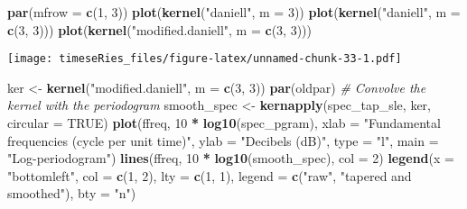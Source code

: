 \documentclass[]{book}
\newenvironment{Shaded}{\begin{snugshade}}{\end{snugshade}}
\newcommand{\CommentTok}[1]{\textcolor[rgb]{0.56,0.35,0.01}{\textit{#1}}}
\newcommand{\DataTypeTok}[1]{\textcolor[rgb]{0.13,0.29,0.53}{#1}}
\newcommand{\DecValTok}[1]{\textcolor[rgb]{0.00,0.00,0.81}{#1}}
\newcommand{\KeywordTok}[1]{\textcolor[rgb]{0.13,0.29,0.53}{\textbf{#1}}}
\newcommand{\NormalTok}[1]{#1}
\newcommand{\OperatorTok}[1]{\textcolor[rgb]{0.81,0.36,0.00}{\textbf{#1}}}
\newcommand{\OtherTok}[1]{\textcolor[rgb]{0.56,0.35,0.01}{#1}}
\newcommand{\StringTok}[1]{\textcolor[rgb]{0.31,0.60,0.02}{#1}}
\begin{document}
\begin{Shaded}
\begin{Highlighting}[]
\KeywordTok{par}\NormalTok{(}\DataTypeTok{mfrow =} \KeywordTok{c}\NormalTok{(}\DecValTok{1}\NormalTok{, }\DecValTok{3}\NormalTok{))}
\KeywordTok{plot}\NormalTok{(}\KeywordTok{kernel}\NormalTok{(}\StringTok{"daniell"}\NormalTok{, }\DataTypeTok{m =} \DecValTok{3}\NormalTok{))}
\KeywordTok{plot}\NormalTok{(}\KeywordTok{kernel}\NormalTok{(}\StringTok{"daniell"}\NormalTok{, }\DataTypeTok{m =} \KeywordTok{c}\NormalTok{(}\DecValTok{3}\NormalTok{, }\DecValTok{3}\NormalTok{)))}
\KeywordTok{plot}\NormalTok{(}\KeywordTok{kernel}\NormalTok{(}\StringTok{"modified.daniell"}\NormalTok{, }\DataTypeTok{m =} \KeywordTok{c}\NormalTok{(}\DecValTok{3}\NormalTok{, }\DecValTok{3}\NormalTok{)))}
\end{Highlighting}
\end{Shaded}

\texttt{[image: timeseRies\_files/figure-latex/unnamed-chunk-33-1.pdf]}

\begin{Shaded}
\begin{Highlighting}[]
\NormalTok{ker <-}\StringTok{ }\KeywordTok{kernel}\NormalTok{(}\StringTok{"modified.daniell"}\NormalTok{, }\DataTypeTok{m =} \KeywordTok{c}\NormalTok{(}\DecValTok{3}\NormalTok{, }\DecValTok{3}\NormalTok{))}
\KeywordTok{par}\NormalTok{(oldpar)}
\CommentTok{# Convolve the kernel with the periodogram}
\NormalTok{smooth_spec <-}\StringTok{ }\KeywordTok{kernapply}\NormalTok{(spec_tap_sle, ker, }\DataTypeTok{circular =} \OtherTok{TRUE}\NormalTok{)}
\KeywordTok{plot}\NormalTok{(ffreq, }\DecValTok{10} \OperatorTok{*}\StringTok{ }\KeywordTok{log10}\NormalTok{(spec_pgram), }\DataTypeTok{xlab =} \StringTok{"Fundamental frequencies (cycle per unit time)"}\NormalTok{, }
    \DataTypeTok{ylab =} \StringTok{"Decibels (dB)"}\NormalTok{, }\DataTypeTok{type =} \StringTok{"l"}\NormalTok{, }\DataTypeTok{main =} \StringTok{"Log-periodogram"}\NormalTok{)}
\KeywordTok{lines}\NormalTok{(ffreq, }\DecValTok{10} \OperatorTok{*}\StringTok{ }\KeywordTok{log10}\NormalTok{(smooth_spec), }\DataTypeTok{col =} \DecValTok{2}\NormalTok{)}
\KeywordTok{legend}\NormalTok{(}\DataTypeTok{x =} \StringTok{"bottomleft"}\NormalTok{, }\DataTypeTok{col =} \KeywordTok{c}\NormalTok{(}\DecValTok{1}\NormalTok{, }\DecValTok{2}\NormalTok{), }\DataTypeTok{lty =} \KeywordTok{c}\NormalTok{(}\DecValTok{1}\NormalTok{, }\DecValTok{1}\NormalTok{), }\DataTypeTok{legend =} \KeywordTok{c}\NormalTok{(}\StringTok{"raw"}\NormalTok{, }\StringTok{"tapered and smoothed"}\NormalTok{), }
    \DataTypeTok{bty =} \StringTok{"n"}\NormalTok{)}
\end{Highlighting}
\end{Shaded}
\end{document}
